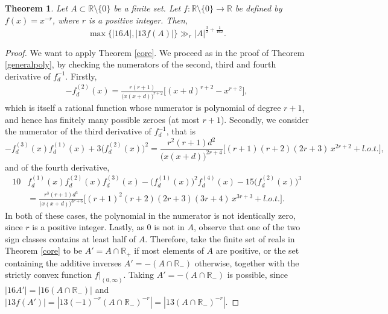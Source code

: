 \documentclass[11pt]{amsart}
\newcommand{\R}{\mathbb{R}}
\newtheorem{theorem}{Theorem}[section]
\begin{document}
\begin{theorem}
    Let $A \subset \mathbb R \setminus \{0 \}$ be a finite set. Let $f:\R\!\setminus\!\{0\}\rightarrow\R$ be defined by $f(x)= x^{-r}$, where $r$ is a positive integer. Then,
    \[
    \max \{|16A|, |13f(A)| \} \gg_r |A|^{\frac{3}{2} +\frac{1}{162}}.
    \]
\end{theorem}
\begin{proof}
    We want to apply Theorem \ref{core}. We proceed as in the proof of Theorem \ref{generalpoly}, by checking the numerators of the second, third and fourth derivative of $f_d^{-1}.$ Firstly, \begin{equation*}
        \begin{split}
            -f_d^{(2)}(x)=\frac{r(r+1)}{\big(x(x+d)\big)^{r+2}}\Big[(x+d)^{r+2}-x^{r+2}\Big],
        \end{split}
    \end{equation*}which is itself a rational function whose numerator is polynomial of degree $r+1$, and hence has finitely many possible zeroes (at most $r+1$). Secondly, we consider the numerator of the third derivative of $f_d^{-1}$, that is \begin{equation*}
            -f_d^{(3)}(x)f_d^{(1)}(x)+3\big(f_d^{(2)}(x)\big)^2=\frac{r^2(r+1)d^2}{\big(x(x+d)\big)^{2r+4}}\Big[(r+1)(r+2)(2r+3)\,x^{2r+2}+l.o.t.\Big],
    \end{equation*}and of the fourth derivative, \begin{equation*}
        \begin{split}
            10&f_d^{(1)}(x)f_d^{(2)}(x)f_d^{(3)}(x)-\big(f_d^{(1)}(x)\big)^2f_d^{(4)}(x)-15\big(f_d^{(2)}(x)\big)^3\\
            &=\frac{r^3(r+1)d^3}{\big(x(x+d)\big)^{3r+6}}\Big[(r+1)^2(r+2)(2r+3)(3r+4)\,x^{3r+3}+l.o.t.\Big].
        \end{split}
    \end{equation*}In both of these cases, the polynomial in the numerator is not identically zero, since $r$ is a positive integer. Lastly, as $0$ is not in $A$, observe that one of the two sign classes contains at least half of $A$. Therefore, take the finite set of reals in Theorem \ref{core} to be $A'=A\cap\R_+$ if most elements of $A$ are positive, or the set containing the additive inverses $A'=-(A\cap\R_-)$ otherwise, together with the strictly convex function $f\big|_{(0,\infty)}$. Taking $A'=-(A\cap\R_-)$ is possible, since $|16A'|=|16(A\cap\R_-)|$ and $|13f(A')|=|13(-1)^{-r}(A\cap\R_-)^{-r}|=|13(A\cap\R_-)^{-r}|.$
\end{proof}
\end{document}
